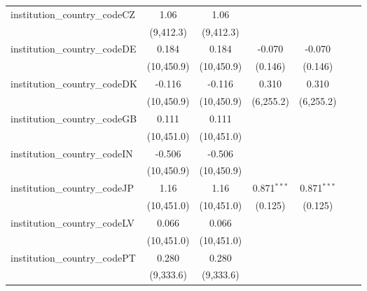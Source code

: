 \begin{tabular}{lcccccc}
   institution\_country\_codeCZ          & 1.06           & 1.06           &               &               &               &   \\   
                                         & (9,412.3)      & (9,412.3)      &               &               &               &   \\   
   institution\_country\_codeDE          & 0.184          & 0.184          & -0.070        & -0.070        &               &   \\   
                                         & (10,450.9)     & (10,450.9)     & (0.146)       & (0.146)       &               &   \\   
   institution\_country\_codeDK          & -0.116         & -0.116         & 0.310         & 0.310         &               &   \\   
                                         & (10,450.9)     & (10,450.9)     & (6,255.2)     & (6,255.2)     &               &   \\   
   institution\_country\_codeGB          & 0.111          & 0.111          &               &               &               &   \\   
                                         & (10,451.0)     & (10,451.0)     &               &               &               &   \\   
   institution\_country\_codeIN          & -0.506         & -0.506         &               &               &               &   \\   
                                         & (10,450.9)     & (10,450.9)     &               &               &               &   \\   
   institution\_country\_codeJP          & 1.16           & 1.16           & 0.871$^{***}$ & 0.871$^{***}$ &               &   \\   
                                         & (10,451.0)     & (10,451.0)     & (0.125)       & (0.125)       &               &   \\   
   institution\_country\_codeLV          & 0.066          & 0.066          &               &               &               &   \\   
                                         & (10,451.0)     & (10,451.0)     &               &               &               &   \\   
   institution\_country\_codePT          & 0.280          & 0.280          &               &               &               &   \\   
                                         & (9,333.6)      & (9,333.6)      &               &               &               &   \\   

\end{tabular}
